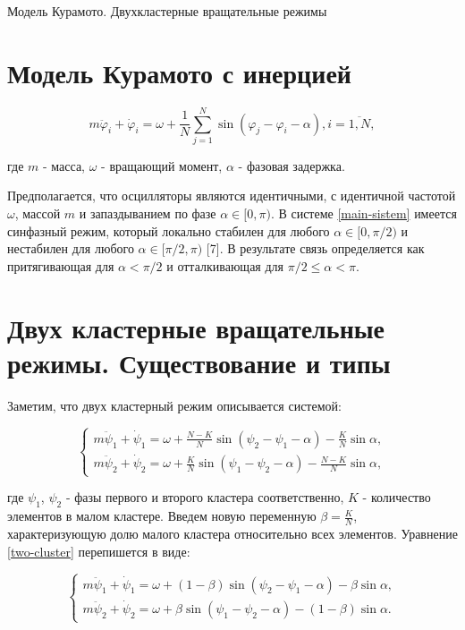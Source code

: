 \begin{chapter}{Модель Курамото. Двухкластерные вращательные режимы}
	\section{Модель Курамото с инерцией}

	\begin{equation} \label{main-sistem}
		m\ddot{\varphi}_i + \dot{\varphi}_i = \omega + 
		\frac{1}{N} \sum_{j = 1}^N \sin{(\varphi_j - 
		\varphi_i - \alpha)}, i = \overline{1, N}, 
	\end{equation}
	
	где $m$ - масса, $\omega$ - вращающий момент,
	$\alpha$ - фазовая задержка.
	
	Предполагается, что осцилляторы являются идентичными, с идентичной частотой $\omega$, массой $m$ и запаздыванием по
	фазе $\alpha \in [0, \pi)$. В системе \ref{main-sistem} имеется синфазный режим, который локально стабилен для любого $\alpha \in [0, \pi/2)$
	и нестабилен для любого $\alpha \in [\pi/2, \pi)$ [7]. В результате связь определяется как
	притягивающая для $\alpha < \pi/2$ и отталкивающая для $\pi/2 \leq \alpha < \pi$.

	\section{Двух кластерные вращательные режимы. Существование и типы}
	
	Заметим, что двух кластерный режим описывается системой:
	
	\begin{equation} \label{two-cluster}
		\begin{cases}
			m\ddot{\psi}_1 + \dot{\psi}_1 = \omega + \frac{N-K}{N} \sin{(\psi_2 - \psi_1 - \alpha)} - \frac{K}{N}\sin{\alpha},\\
			m\ddot{\psi}_2 + \dot{\psi}_2 = \omega + \frac{K}{N} \sin{(\psi_1 - \psi_2 - \alpha)} - \frac{N - K}{N}\sin{\alpha},
		\end{cases}
	\end{equation}
	
	где $\psi_1$, $\psi_2$ - фазы первого и
	второго кластера соответственно, $K$ - количество элементов в малом кластере.
	Введем новую переменную $\beta = \frac{K}{N}$, характеризующую долю малого кластера относительно всех элементов. 
	Уравнение \ref{two-cluster} перепишется в виде:
	
	\begin{equation} \label{two-cluster-beta}
		\begin{cases}
			m\ddot{\psi}_1 + \dot{\psi}_1 = \omega + (1 - \beta) \sin{(\psi_2 - \psi_1 - \alpha)} - \beta\sin{\alpha}, \\
			m\ddot{\psi}_2 + \dot{\psi}_2 = \omega + \beta \sin{(\psi_1 - \psi_2 - \alpha)} - (1 - \beta)\sin{\alpha}.
		\end{cases}
	\end{equation}
	

\end{chapter}
